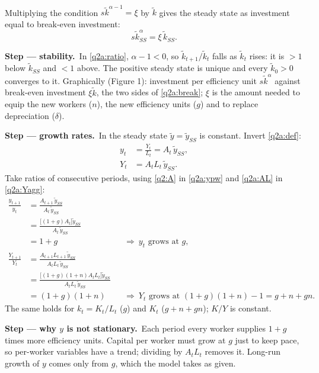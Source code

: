 \documentclass[11pt,a4paper]{article}
\newcommand{\passo}[2]{\par\smallskip\noindent\textbf{Step --- #1.}~#2}
\begin{document}
\begin{sol}
\begin{align}
\end{align}
Multiplying the condition $s\tilde k^{\alpha-1}=\xi$ by $\tilde k$ gives the steady state as
investment equal to break-even investment:
\begin{equation}
s\tilde k_{SS}^{\alpha}=\xi\,\tilde k_{SS}. \label{q2a:break}
\end{equation}
\passo{stability}{In \eqref{q2a:ratio}, $\alpha-1<0$, so $\tilde k_{t+1}/\tilde k_t$ falls as
$\tilde k_t$ rises: it is $>1$ below $\tilde k_{SS}$ and $<1$ above. The positive steady state is
unique and every $\tilde k_0>0$ converges to it. Graphically (Figure 1): investment per efficiency
unit $s\tilde k^{\alpha}$ against break-even investment $\xi\tilde k$, the two sides of
\eqref{q2a:break}; $\xi$ is the amount needed to equip the new workers ($n$), the new efficiency
units ($g$) and to replace depreciation ($\delta$).}
\passo{growth rates}{In the steady state $\tilde y=\tilde y_{SS}$ is constant. Invert
\eqref{q2a:def}:}
\begin{align}
y_t &= \frac{Y_t}{L_t}=A_t\,\tilde y_{SS}, \label{q2a:ypw}\\
Y_t &= A_tL_t\,\tilde y_{SS}. \label{q2a:Yagg}
\end{align}
Take ratios of consecutive periods, using \eqref{q2:A} in \eqref{q2a:ypw} and \eqref{q2a:AL} in
\eqref{q2a:Yagg}:
\begin{align*}
\frac{y_{t+1}}{y_t} &= \frac{A_{t+1}\,\tilde y_{SS}}{A_t\,\tilde y_{SS}}\\
&= \frac{\big[(1+g)A_t\big]\tilde y_{SS}}{A_t\,\tilde y_{SS}}\\
&= 1+g &&\Rightarrow\ y_t\text{ grows at }\boxed{g},\\
\frac{Y_{t+1}}{Y_t} &= \frac{A_{t+1}L_{t+1}\,\tilde y_{SS}}{A_tL_t\,\tilde y_{SS}}\\
&= \frac{\big[(1+g)(1+n)A_tL_t\big]\tilde y_{SS}}{A_tL_t\,\tilde y_{SS}}\\
&= (1+g)(1+n) &&\Rightarrow\ Y_t\text{ grows at }\boxed{(1+g)(1+n)-1=g+n+gn}.
\end{align*}
The same holds for $k_t=K_t/L_t$ ($g$) and $K_t$ ($g+n+gn$); $K/Y$ is constant.
\passo{why $y$ is not stationary}{Each period every worker supplies $1+g$ times more efficiency units.
Capital per worker must grow at $g$ just to keep pace, so per-worker variables have a trend; dividing by
$A_tL_t$ removes it. Long-run growth of $y$ comes only from $g$, which the model takes as given.}
\begin{center}
\begin{tikzpicture}

\end{tikzpicture}
\end{center}
\end{sol}
\end{document}
